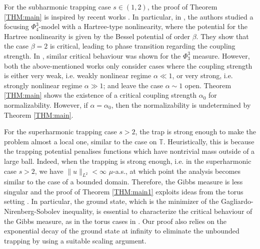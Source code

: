\documentclass[%
11pt,  reqno]{amsart}
\theoremstyle{remarkstyle}
\newcommand{\1}{\hspace{0.2mm}\text{I}\hspace{0.2mm}}
\newcommand{\T}{\mathbb{T}}
\newcommand{\al}{\alpha}
\numberwithin{equation}{section}
\numberwithin{theorem}{section}
\begin{document}
	For the subharmonic trapping case $s \in (1,2)$, the proof of Theorem \ref{THM:main} is inspired by recent works \cite{OOT,OOT1,TW23}. In particular, in \cite{OOT}, the authors studied a focusing $\Phi_4^3$-model with a Hartree-type nonlinearity, where the potential for the Hartree nonlinearity is given by the Bessel potential of order $\beta$. They show that the case $\beta = 2$ is critical, leading to phase transition regarding the coupling strength. In \cite{OOT1}, similar critical behaviour was shown for the $\Phi_3^3$ measure. However, both the above-mentioned works only consider  cases where the coupling strength is either very weak, i.e. weakly nonlinear regime $\al \ll 1$, or very strong, i.e. strongly nonlinear regime $\al \gg 1$; and leave the case $\al \sim 1$ open. Theorem \ref{THM:main} shows the existence of a critical coupling strength $\al_0$ for normalizability. However, if $\al = \al_0$, then the normalizability is undetermined by Theorem \ref{THM:main}.
	
	For the superharmonic trapping case $s > 2$, the trap is strong enough to make the problem almost a local one, similar to the case on $\T$. Heuristically, this is because the trapping potential penalises functions which have nontrivial mass outside of a large ball. Indeed, when the trapping is strong enough, i.e. in the superharmonic case $s > 2$, we have $\|u\|_{L^2} < \infty$ $\mu$-a.s., at which point the analysis becomes similar to the case of a bounded domain. Therefore, the Gibbs measure is less singular and the proof of Theorem \ref{THM:main1} exploits ideas from the torus setting \cite{LW22,OST22}. In particular, the ground state, which is the minimizer of the Gagliardo-Nirenberg-Sobolev inequality, is essential to characterize the critical behaviour of the Gibbs measure, as in the torus cases in \cite{LW22,OST22}. Our proof also relies on the exponential decay of the ground state at infinity to eliminate the unbounded trapping by using a suitable scaling argument.
	
\end{document}
